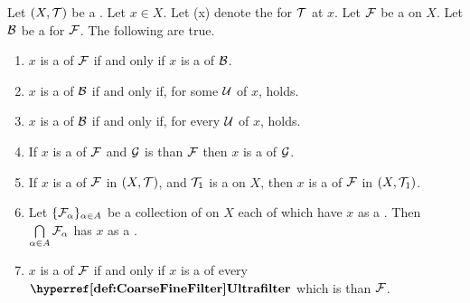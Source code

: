 \begin{prop}
\label{prop:FilterConvergenceFacts}
    Let $(X,\mathcal{T})$ be a \TopologicalSpace. 
    Let $x \in X$. 
    Let \NeighborhoodFilterInstance{\scT}(x) denote the 
    \NeighborhoodFilter for $\mathcal{T}$ at $x$. 
    Let $\mathcal{F}$ be a \Filter on $X$. 
    Let $\mathcal{B}$ be a \FilterBase for $\mathcal{F}$. 
    The following are true. 
    \begin{enumerate}[label=(\roman*), ref={\ref{prop:FilterConvergenceFacts}.~\roman*}]
    \item 
    \label{prop:FilterConvergenceFacts:BaseEquivalence}
    $x$ is a \FilterLimit of $\mathcal{F}$ if and only if $x$ is a \FilterLimit of $\mathcal{B}$. 
    \item 
    \label{prop:FilterConvergenceFacts:FundamentalSystemExistence}
    $x$ is a \FilterLimit of $\mathcal{B}$ if and only if, for some 
    \FundamentalSystemOfNeighborhoods $\mathcal{U}$ of $x$, 
    \scNested{\scB}{\scU} holds. 
    \item 
    \label{prop:FilterConvergenceFacts:FundamentalSystemForAll}
    $x$ is a \FilterLimit of $\mathcal{B}$ if and only if, 
    for every 
    \FundamentalSystemOfNeighborhoods $\mathcal{U}$ of $x$, 
    \scNested{\scB}{\scU} holds. 
    \item 
    \label{prop:FilterConvergenceFacts:FinerFilter}
    If $x$ is a \FilterLimit of $\mathcal{F}$ and $\mathcal{G}$ is \FinerFilter
    than $\mathcal{F}$ then $x$ is a \FilterLimit of $\mathcal{G}$. 
    \item 
    \label{prop:FilterConvergenceFacts:CoarserTopology}
    If $x$ is a \FilterLimit of $\mathcal{F}$ in $(X,\mathcal{T})$, and 
    $\mathcal{T}_1$ is a \TopologyCoarser \Topology on $X$, then 
    $x$ is a \FilterLimit of $\mathcal{F}$ in $(X, \mathcal{T}_1)$. 
    \item Let $\{\mathcal{F}_\alpha\}_{\alpha \in A}$ be a collection of 
    \Filters on $X$ each of which have $x$ as a \FilterLimit. 
    Then $\bigcap\limits_{\alpha \in A} \mathcal{F}_\alpha$ has $x$
    as a \FilterLimit. 
    \item 
    \label{prop:FilterConvergenceFacts:UltrafilterCondition}
    $x$ is a \FilterLimit of $\mathcal{F}$ if and only if 
    $x$ is a \FilterLimit of every $\UltraFilter$ 
    which is \FinerFilter than $\mathcal{F}$. 
    \end{enumerate}
\end{prop}
